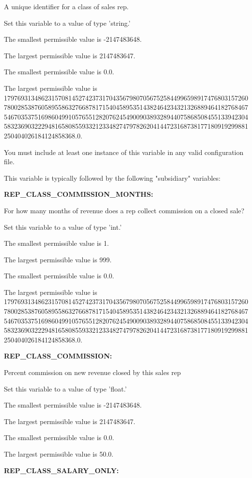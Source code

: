 A unique identifier for a class of sales rep.

Set this variable to a value of type 'string.'

The smallest permissible value is -2147483648.

The largest permissible value is 2147483647.

The smallest permissible value is 0.0.

The largest permissible value is 179769313486231570814527423731704356798070567525844996598917476803157260780028538760589558632766878171540458953514382464234321326889464182768467546703537516986049910576551282076245490090389328944075868508455133942304583236903222948165808559332123348274797826204144723168738177180919299881250404026184124858368.0.

You must include at least one instance of this variable in any valid configuration file.

This variable is typically followed by the following "subsidiary" variables:


\textbf{REP\_CLASS\_COMMISSION\_MONTHS:}


For how many months of revenue does a rep collect commission on a closed sale?

Set this variable to a value of type 'int.'

The smallest permissible value is 1.

The largest permissible value is 999.

The smallest permissible value is 0.0.

The largest permissible value is 179769313486231570814527423731704356798070567525844996598917476803157260780028538760589558632766878171540458953514382464234321326889464182768467546703537516986049910576551282076245490090389328944075868508455133942304583236903222948165808559332123348274797826204144723168738177180919299881250404026184124858368.0.


\textbf{REP\_CLASS\_COMMISSION:}


Percent commission on new revenue closed by this sales rep

Set this variable to a value of type 'float.'

The smallest permissible value is -2147483648.

The largest permissible value is 2147483647.

The smallest permissible value is 0.0.

The largest permissible value is 50.0.


\textbf{REP\_CLASS\_SALARY\_ONLY:}


